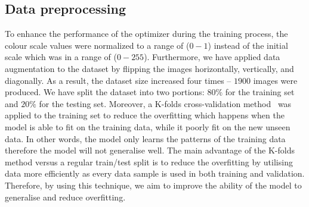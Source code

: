 \subsection{Data preprocessing}
To enhance the performance of the optimizer during the training process, the colour scale values were normalized to a range of (\(0-1\)) instead of the initial scale which was in a range of (\(0 - 255\)).	
Furthermore, we have applied data augmentation to the dataset by flipping the images horizontally, vertically, and diagonally. 
As a result, the dataset size increased four times -- \(1900\)  images were produced.
We have split the dataset into two portions:  \(80\%\) for the training set and \(20\%\) for the testing set.
Moreover, a K-folds cross-validation method~\cite{Srinivasan2019} was applied to the training set to reduce the overfitting which happens when the model is able to fit on the training data, while it poorly fit on the new unseen data.
In other words, the model only learns the patterns of the training data therefore the model will not generalise well. 
The main advantage of the K-folds method versus a regular train/test split is to reduce the overfitting by utilising data more efficiently as every data sample is used in both training and validation. 
Therefore, by using this technique, we aim to improve the ability of the model to generalise and reduce overfitting.